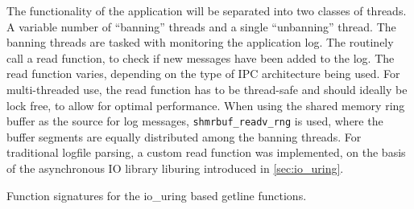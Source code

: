 The functionality of the application will be separated into two classes of threads. A variable number of ``banning'' threads
and a single ``unbanning'' thread. The banning threads are tasked with monitoring the application log. The routinely call a read
function, to check if new messages have been added to the log. The read function varies, depending on the type of \ac{IPC} architecture
being used. For multi-threaded use, the read function has to be thread-safe and should ideally be lock free, to allow for optimal performance.
When using the shared memory ring buffer as the source for log messages, \texttt{shmrbuf\_readv\_rng} is used, where the buffer segments
are equally distributed among the banning threads. For traditional logfile parsing, a custom read function was implemented, on the
basis of the asynchronous \ac{IO} library liburing introduced in \ref{sec:io_uring}.

\begin{algorithm}[h!]
    
    \caption[Asynchronous Getline Function]{Function signatures for the io\_uring based getline functions.}
    \label{alg:uring_getline}
\end{algorithm}

